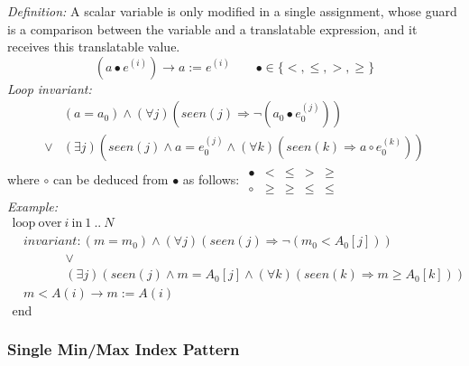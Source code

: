 \documentclass[a4paper,10pt]{article}
\newcommand{\idx}{\ensuremath{i}\xspace}
\newcommand{\at}[1]{{(#1)}}
\newcommand{\KWloop}{\ensuremath{\mathrm{loop}~}}
\newcommand{\KWend}{\ensuremath{\mathrm{end}~}}
\newcommand{\KWover}{\ensuremath{\mathrm{over}~}}
\newcommand{\KWin}{\ensuremath{~\mathrm{in}~}}
\newcommand{\impl}{\ensuremath{\Longrightarrow}}
\newcommand{\seen}[1]{\ensuremath{\mathit{seen}(#1)}\xspace}
\newcommand{\loopinvariant}{\noindent\textit{Loop invariant:}\xspace}
\newcommand{\patterndef}{\noindent\textit{Definition:}\xspace}
\newcommand{\patternexample}{\noindent\textit{Example:}\xspace}
\begin{document}
\patterndef A scalar variable is only modified in a single assignment, whose
guard is a comparison between the variable and a translatable expression, and
it receives this translatable value.
%
$$(a \bullet e^\at{\idx}) \rightarrow a := e^\at{\idx}  \qquad \bullet \in \{<, \leq, >, \geq \}$$
%
\loopinvariant
%
\begin{eqnarray*}
&(a = a_0) \land (\forall j)(\seen{j} \impl \neg (a_0 \bullet e_0^\at{j}))\\
\lor 
& (\exists j)(\seen{j} \land a = e_0^\at{j} \land (\forall k)(\seen{k} \impl a \circ e_0^\at{k}))
\end{eqnarray*}
where $\circ$ can be deduced from $\bullet$ as follows:
$\begin{array}{l|llll}
\bullet & <    & \leq & >    & \geq \\ \hline
\circ   & \geq & \geq & \leq & \leq
\end{array}$\\
%
\patternexample
$$\begin{array}{l}
  \KWloop \KWover i \KWin 1~..~N \\
  ~~~~ \textit{invariant}: (m = m_0) \land (\forall j)(\seen{j} \impl \neg (m_0 < A_0[j]))\\
  ~~~~~~~~~~~~~~~~~~~ \lor \\ 
  ~~~~~~~~~~~~~~~~~~~ (\exists j)(\seen{j} \land m = A_0[j] \land (\forall k)(\seen{k} \impl m \geq A_0[k]))\\
  ~~~~ m < A(i) \rightarrow m := A(i)\\
  \KWend
\end{array}$$

\subsubsection*{Single Min/Max Index Pattern}
\end{document}
